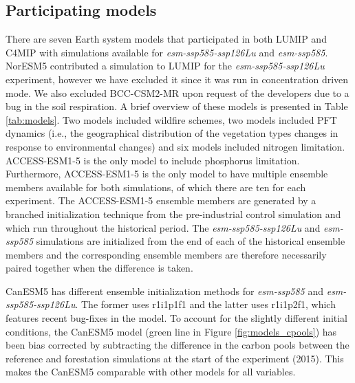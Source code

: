 \documentclass[draft]{agujournal2019}
\begin{document}
\subsection{Participating models}

There are seven Earth system models that participated in both LUMIP and C4MIP with simulations available for \textit{esm-ssp585-ssp126Lu} and \textit{esm-ssp585}.
NorESM5 contributed a simulation to LUMIP for the \textit{esm-ssp585-ssp126Lu} experiment, however we have excluded it since it was run in concentration driven mode.
We also excluded BCC-CSM2-MR upon request of the developers due to a bug in the soil respiration.
A brief overview of these models is presented in Table \ref{tab:models}.
Two models included wildfire schemes, two models included PFT dynamics (i.e., the geographical distribution of the vegetation types changes in response to environmental changes) and six models included nitrogen limitation.
ACCESS-ESM1-5 is the only model to include phosphorus limitation.
Furthermore, ACCESS-ESM1-5 is the only model to have multiple ensemble members available for both simulations, of which there are ten for each experiment.
The ACCESS-ESM1-5 ensemble members are generated by a branched initialization technique from the pre-industrial control simulation and which run throughout the historical period.
The \textit{esm-ssp585-ssp126Lu} and \textit{esm-ssp585} simulations are initialized from the end of each of the historical ensemble members and the corresponding ensemble members are therefore necessarily paired together when the difference is taken.

CanESM5 has different ensemble initialization methods for \textit{esm-ssp585} and \textit{esm-ssp585-ssp126Lu}.
The former uses r1i1p1f1 and the latter uses r1i1p2f1, which features recent bug-fixes in the model.
To account for the slightly different initial conditions, the CanESM5 model (green line in Figure \ref{fig:models_cpools}) has been bias corrected by subtracting the difference in the carbon pools between the reference and forestation simulations at the start of the experiment (2015).
This makes the CanESM5 comparable with other models for all variables.
\end{document}
